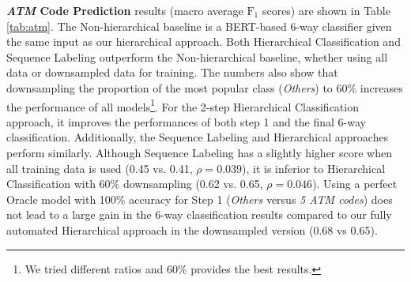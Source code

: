 \documentclass[runningheads]{llncs}
\begin{document}
\textbf{\textit{ATM} Code Prediction} results (macro average $\mathrm{F_1}$ scores) %
are shown in Table \ref{tab:atm}.
The Non-hierarchical baseline is a BERT-based 6-way classifier given the same input as our hierarchical approach.
Both Hierarchical Classification 
and 
Sequence Labeling 
outperform the  Non-hierarchical baseline, %
 whether using all data or downsampled data for training. %
The numbers also show that downsampling the proportion of the most popular class (\textit{Others}) to 60\% increases the performance of all models\footnote{We tried different ratios and 60\% provides the best results.}. 
For the 2-step Hierarchical Classification approach, it improves the performances of both step 1 
and the final 6-way classification. %
Additionally, the Sequence Labeling  and Hierarchical approaches perform similarly. Although Sequence Labeling has a slightly higher score when all training data is used (0.45 vs. 0.41, $\rho = 0.039$), it is inferior to Hierarchical Classification with 60\% downsampling  (0.62 vs. 0.65, $\rho = 0.046$).
Using a perfect Oracle model with 100\% accuracy for Step 1 (\textit{Others} versus 
 \textit {5 ATM codes}) does not lead to a large gain in the 6-way classification results compared to
 our fully automated Hierarchical approach in the downsampled version (0.68 vs 0.65).
\end{document}
